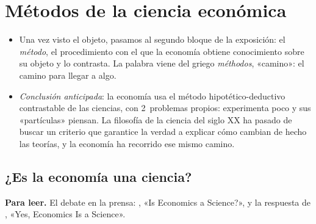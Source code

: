 \documentclass[11pt]{article}
\begin{document}
\section{Métodos de la ciencia económica}\label{sec:metodos}

\begin{itemize}
\item Una vez visto el objeto, pasamos al segundo bloque de la exposición: el \emph{método}, el procedimiento con el que la economía obtiene conocimiento sobre su objeto y lo contrasta. La palabra viene del griego \emph{méthodos}, «camino»: el camino para llegar a algo.
\item \emph{Conclusión anticipada}: la economía usa el método hipotético-deductivo contrastable de las ciencias, con 2~problemas propios: experimenta poco y sus «partículas» piensan. La filosofía de la ciencia del siglo XX ha pasado de buscar un criterio que garantice la verdad a explicar cómo cambian de hecho las teorías, y la economía ha recorrido ese mismo camino.
\end{itemize}

\subsection{¿Es la economía una ciencia?}\label{sec:ciencia}

\begin{anotaciones}
\textbf{Para leer.} El debate en la prensa:  \parencite*{Shiller2013Guardian}, «Is Economics a Science?», y la respuesta de  \parencite*{Chetty2013Science}, «Yes, Economics Is a Science».
\end{anotaciones}
\end{document}
